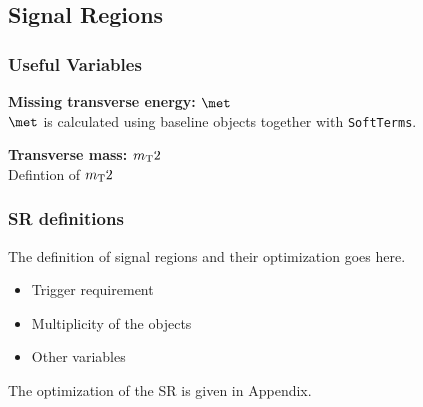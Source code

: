 \subsection{Signal Regions}
\subsubsection{Useful Variables}
{\bf Missing transverse energy: $\met$}\\
$\met$ is calculated using baseline objects together with \verb+SoftTerms+.

{\bf Transverse mass: $m_\mathrm{T}2$}\\
Defintion of $m_\mathrm{T}2$


\subsubsection{SR definitions}

The definition of signal regions and their optimization goes here.

\begin{itemize}
  \item Trigger requirement
  \item Multiplicity of the objects
  \item Other variables
\end{itemize}

The optimization of the SR is given in Appendix.
% 
